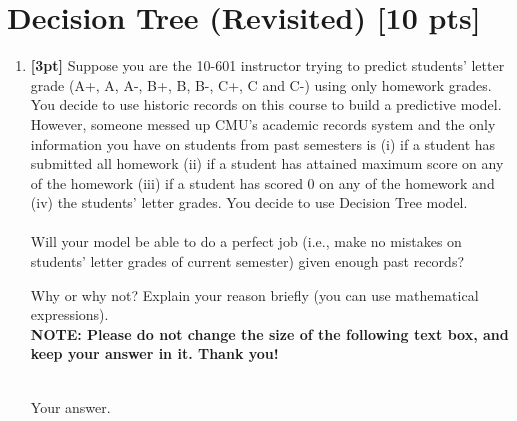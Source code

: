 \documentclass[12pt]{article}
\renewcommand{\circle}{\tikz\draw[black] (0,0) circle (1ex);}
\begin{document}
\section{Decision Tree (Revisited) [10 pts]}
\begin{enumerate}

    \item \textbf{[3pt]} Suppose you are the 10-601 instructor trying to predict students' letter grade (A+, A, A-, B+, B, B-, C+, C and C-) using only homework grades. You decide to use historic records on this course to build a predictive model. However, someone messed up CMU's academic records system and the only information you have on students from past semesters is (i) if a student has submitted all homework (ii) if a student has attained maximum score on any of the homework (iii) if a student has scored 0 on any of the homework and (iv) the students' letter grades. You decide to use Decision Tree model. \\ \\
    Will your model be able to do a perfect job (i.e., make no mistakes on students' letter grades of current semester) given enough past records?
    
    Why or why not? Explain your reason briefly (you can use mathematical expressions).\\
    
    \textbf{NOTE: Please do not change the size of the following text box, and keep your answer in it. Thank you!} \\ \\
    \begin{tcolorbox}[fit,height=4cm, width=15cm, blank, borderline={1pt}{-2pt},nobeforeafter]
    \large
    Your answer.

    \end{tcolorbox}
    
    \clearpage
    

\end{enumerate}
\end{document}
